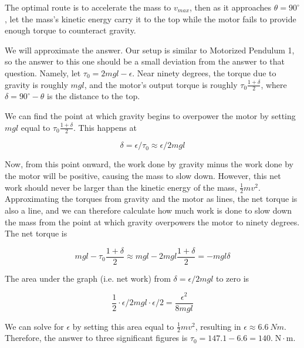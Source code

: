 \begin{solution}
    The optimal route is to accelerate the mass to $v_{max}$, then as it approaches $\theta=90^{\circ}$, let the mass's kinetic energy carry it to the top while the motor fails to provide enough torque to counteract gravity. 

    We will approximate the answer. Our setup is similar to Motorized Pendulum 1, so the answer to this one should be a small deviation from the answer to that question. Namely, let $\tau_0 = 2mgl-\epsilon $. Near ninety degrees, the torque due to gravity is roughly $mgl$, and the motor's output torque is roughly $\tau_0 \frac{1+\delta}{2}$, where $\delta=90^{\circ} - \theta$ is the distance to the top. 

    We can find the point at which gravity begins to overpower the motor by setting $mgl$ equal to $\tau_0 \frac{1+\delta}{2}$. This happens at 
    
    $$\delta=\epsilon/\tau_0 \approx \epsilon/2mgl$$
    
    Now, from this point onward, the work done by gravity minus the work done by the motor will be positive, causing the mass to slow down. However, this net work should never be larger than the kinetic energy of the mass, $\frac{1}{2}mv^2$. Approximating the torques from gravity and the motor as lines, the net torque is also a line, and we can therefore calculate how much work is done to slow down the mass from the point at which gravity overpowers the motor to ninety degrees. The net torque is 

    $$mgl-\tau_0 \frac{1+\delta}{2}\approx mgl-2mgl \frac{1+\delta}{2}=-mgl \delta $$

    The area under the graph (i.e. net work) from $\delta=\epsilon/2mgl$ to zero is 

    $$\frac{1}{2} \cdot \epsilon/2mgl \cdot \epsilon/2 = \frac{\epsilon^2}{8mgl} $$

    We can solve for $\epsilon$ by setting this area equal to $\frac{1}{2} mv^2$, resulting in $\epsilon\approx6.6\ Nm$. Therefore, the answer to three significant figures is $\boxed{\tau_0=147.1-6.6=140. \;\mathrm{N\cdot m}}$.
    

\end{solution}